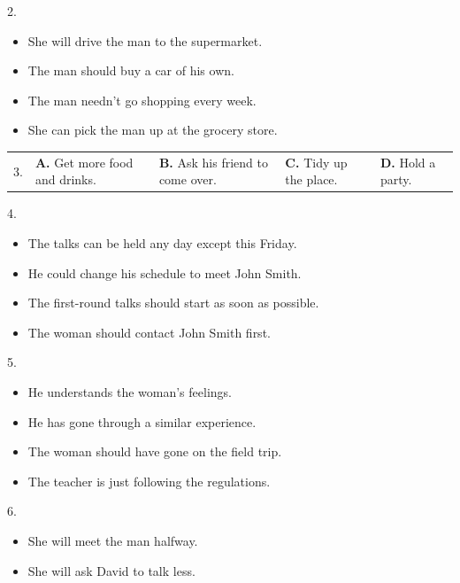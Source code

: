 \documentclass[UTF8,11pt]{ctexart}
\begin{document}
2.


\begin{itemize}[leftmargin=2em,itemsep=.2em,topsep=.4em]\item[A.] She will drive the man to the supermarket.
\item[B.] The man should buy a car of his own.
\item[C.] The man needn’t go shopping every week.
\item[D.] She can pick the man up at the grocery store.
\end{itemize}

\noindent\begin{tabularx}{\linewidth}{@{}lXXXX@{}}3. & \textbf{A.} Get more food and drinks. & \textbf{B.} Ask his friend to come over. & \textbf{C.} Tidy up the place. & \textbf{D.} Hold a party.\\\end{tabularx}\par

4.


\begin{itemize}[leftmargin=2em,itemsep=.2em,topsep=.4em]\item[A.] The talks can be held any day except this Friday.
\item[B.] He could change his schedule to meet John Smith.
\item[C.] The first-round talks should start as soon as possible.
\item[D.] The woman should contact John Smith first.
\end{itemize}

5.


\begin{itemize}[leftmargin=2em,itemsep=.2em,topsep=.4em]\item[A.] He understands the woman’s feelings.
\item[B.] He has gone through a similar experience.
\item[C.] The woman should have gone on the field trip.
\item[D.] The teacher is just following the regulations.
\end{itemize}

6.


\begin{itemize}[leftmargin=2em,itemsep=.2em,topsep=.4em]\item[A.] She will meet the man halfway.
\item[C.] She will ask David to talk less.
\end{itemize}
\end{document}
